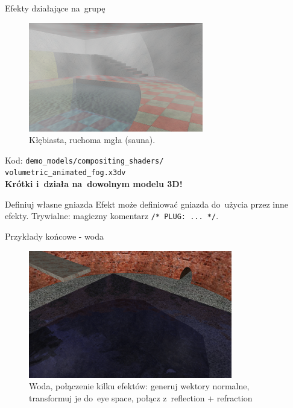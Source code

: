 \documentclass{beamer}
\begin{document}
\begin{frame}{Efekty działające na~grupę}

\begin{figure}
  \centering
  \includegraphics[width=3in]{../volumetric_animated_fog_all}
  \caption{Kłębiasta, ruchoma mgła (sauna).}
\end{figure}

Kod: \texttt{demo\_models/compositing\_shaders/\\volumetric\_animated\_fog.x3dv}\\
\textbf{Krótki i~działa na~dowolnym modelu 3D!}


\end{frame}

\begin{frame}{Definiuj własne gniazda}
Efekt może definiować gniazda do~użycia przez inne efekty.
Trywialne: magiczny komentarz \texttt{/* PLUG: ... */}.
\end{frame}

\begin{frame}{Przykłady końcowe - woda}
\begin{figure}
  \centering
  \includegraphics[width=3.5in]{../water_shaders_3}
  \caption{Woda, połączenie kilku efektów: generuj wektory normalne, transformuj je do~eye space, połącz z~reflection + refraction}
\end{figure}
\end{frame}
\end{document}
